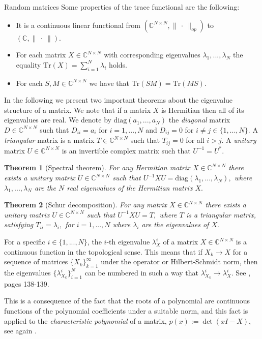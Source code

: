 \documentclass[11pt, a4paper, oneside]{book}
\numberwithin{equation}{chapter}
\newtheorem{thm}{Theorem}[section]
\begin{document}
\begin{section}{Random matrices}
Some properties of the trace functional are the following:
\begin{itemize}
    \item It is a continuous linear functional from $(\mathbb{C}^{N \times N},\|\ \cdot \ \|_{op})$ to $(\mathbb{C},\|\ \cdot \ \|).$
    \item For each matrix $X\in \mathbb{C}^{N \times N}$ with corresponding eigenvalues $\lambda_1,...,\lambda_N$ the equality $\mathrm{Tr}(X) = \sum \limits_{i=1}^N \lambda_i$ holds.
    \item For each $S,M \in \mathbb{C}^{N \times N}$ we have that $\mathrm{Tr}(SM) = \mathrm{Tr} (MS) .$
\end{itemize}
In the following we present two important theorems about the eigenvalue structure of a matrix. We note that if a matrix $X$ is Hermitian then all of its eigenvalues are real. We denote by $\mathrm{diag}(a_1,...,a_N)$ the \textit{diagonal} matrix $D \in \mathbb{C}^{N \times N}$ such that $D_{ii}=a_i$ for $i=1,...,N$ and $D_{ij} = 0$ for $i\neq j \in \{1,...,N\}.$ A \textit{triangular} matrix is a matrix $T\in \mathbb{C}^{N \times N}$ such that $T_{ij}=0$ for all $i>j.$ A \textit{unitary} matrix $U \in \mathbb{C}^{N \times N}$ is an invertible complex matrix such that $U^{-1}=U^*.$ 
%
\begin{thm}[Spectral theorem]
For any Hermitian matrix $X\in \mathbb{C}^{N \times N}$ there exists a unitary matrix $U\in \mathbb{C}^{N \times N}$ such that $U^{-1} X U = \mathrm{diag}(\lambda_1,...,\lambda_N),$ where $\lambda_1,...,\lambda_N$ are the $N$ real eigenvalues of the Hermitian matrix $X.$
\end{thm}
%
\begin{thm}[Schur decomposition] For any matrix $X\in \mathbb{C}^{N \times N}$ there exists a unitary matrix $U \in \mathbb{C}^{N \times N}$ such that $U^{-1} X U = T,$ where $T$ is a triangular matrix, satisfying $T_{ii}=\lambda_i,$ for $i=1,...,N$ where $\lambda_i$ are the eigenvalues of $X.$
\end{thm}
%
For a specific $i \in \{1,...,N\}$, the $i$-th eigenvalue $\lambda_X^i$ of a matrix $X \in \mathbb{C}^{N \times N}$ is a continuous function in the topological sense. This means that if $X_k \to X$ for a sequence of matrices $\{X_k\}_{k=1}^\infty$ under the operator or Hilbert-Schmidt norm, then the eigenvalues $\{\lambda_{X_k}^i\}_{i=1}^N$ can be numbered in such a way that $\lambda_{X_k}^i \to \lambda_X^i$. See \cite{Artin:1998}, pages 138-139. 

This is a consequence of the fact that the roots of a polynomial are continuous functions of the polynomial coefficients under a suitable norm, and this fact is applied to the \textit{characteristic polynomial} of a matrix, $p(x):= \det(xI - X)$, see again \cite{Artin:1998}.


\end{section}
\end{document}
